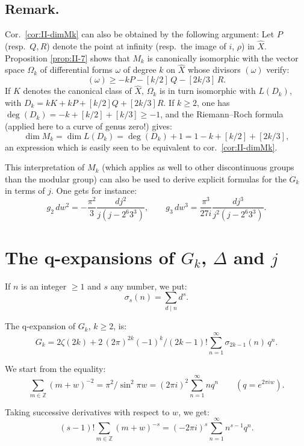 \subsection*{Remark.}
Cor.~\ref{cor:II-dimMk} can also be obtained by the following argument:
Let $P$ (resp.\ $Q,R$) denote the point at infinity (resp.\ the image of
$i$, $\rho$) in $\hat{X}$. Proposition \ref{prop:II-7} shows that $M_{k}$
is canonically isomorphic with the vector space $\Omega_{k}$ of
differential forms $\omega$ of degree $k$ on $\hat{X}$ whose divisors
$(\omega)$ verify:
\[
(\omega)\geq-kP-[k/2]\,Q-[2k/3]\,R.
\tag{9}\label{eq:II-9}
\]
If $K$ denotes the canonical class of $\hat{X}$, $\Omega_{k}$ is in turn
isomorphic with $L(D_{k})$, with
$D_{k}=kK+kP+[k/2]Q+[2k/3]R$. If $k\geq 2$, one has
$\deg(D_{k})=-k+[k/2]+[k/3]\geq -1$, and the Riemann--Roch formula
(applied here to a curve of genus zero!) gives:
\[
\dim M_{k}=\dim L(D_{k})=\deg(D_{k})+1=1-k+[k/2]+[2k/3],
\]
an expression which is easily seen to be equivalent to
cor.~\ref{cor:II-dimMk}.

This interpretation of $M_{k}$ (which applies as well to other
discontinuous groups than the modular group) can also be used to derive
explicit formulas for the $G_{k}$ in terms of $j$. One gets for instance:
\[
g_{2}\,dw^{2}=-\frac{\pi^{2}}{3}\frac{dj^{2}}{j(j-2^{6}3^{3})},\qquad
g_{3}\,dw^{3}=\frac{\pi^{3}}{27i}\frac{dj^{3}}{j^{2}(j-2^{6}3^{3})}.
\tag{10}\label{eq:II-10}
\]

\section{\texorpdfstring{The q-expansions of $G_{k}$, $\Delta$ and
$j$}{The q-expansions of Gk, Delta and j}}\label{sec:II-qexp}

If $n$ is an integer $\geq 1$ and $s$ any number, we put:
\[
\sigma_{s}(n)=\sum_{d\mid n}d^{s}.
\]

\begin{proposition}\label{prop:II-10}
The q-expansion of $G_{k}$, $k\geq 2$, is:
\[
G_{k}=2\zeta(2k)+2\,(2\pi)^{2k}(-1)^{k}/(2k-1)!
\sum_{n=1}^{\infty}\sigma_{2k-1}(n)\,q^{n}.
\tag{11}\label{eq:II-11}
\]
\end{proposition}

We start from the equality:
\[
\sum_{m\in\mathbb{Z}}(m+w)^{-2}=\pi^{2}/\sin^{2}\pi w
=(2\pi i)^{2}\sum_{n=1}^{\infty}nq^{n}\qquad(q=e^{2\pi iw}).
\]

Taking successive derivatives with respect to $w$, we get:
\[
(s-1)!\sum_{m\in\mathbb{Z}}(m+w)^{-s}
=(-2\pi i)^{s}\sum_{n=1}^{\infty}n^{s-1}q^{n}.
\]


